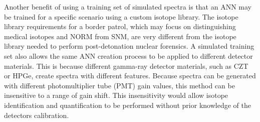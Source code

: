 Another benefit of using a training set of simulated spectra is that an ANN may be trained for a specific scenario using a custom isotope library. The isotope library requirements for a border patrol, which may focus on distinguishing medical isotopes and NORM from SNM, are very different from the isotope library needed to perform post-detonation nuclear forensics. A simulated training set also allows the same ANN creation process to be applied to different detector materials. This is because different gamma-ray detector materials, such as CZT or HPGe, create spectra with different features. Because spectra can be generated with different photomultiplier tube (PMT) gain values, this method can be insensitive to a range of gain shift. This insensitivity would allow isotope identification and quantification to be performed without prior knowledge of the detectors calibration.

